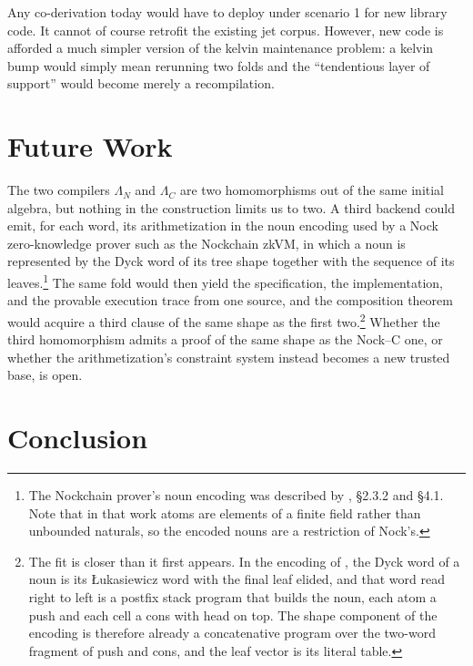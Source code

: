 \documentclass[twoside]{article}
\begin{document}
\noindent
Any co-derivation today would have to deploy under scenario 1 for new library code.  It cannot of course retrofit the existing jet corpus.  However, new code is afforded a much simpler version of the kelvin maintenance problem:  a kelvin bump would simply mean rerunning two folds and the ``tendentious layer of support'' would become merely a recompilation.

\section{Future Work}

The two compilers $\Lambda_N$ and $\Lambda_C$ are two homomorphisms out of the same initial algebra, but nothing in the construction limits us to two.  A third backend could emit, for each word, its arithmetization in the noun encoding used by a Nock zero-knowledge prover such as the Nockchain zkVM, in which a noun is represented by the Dyck word of its tree shape together with the sequence of its leaves.\footnote{The Nockchain prover's noun encoding was described by \citet{Kattis2025}, \S2.3.2 and \S4.1.  Note that in that work atoms are elements of a finite field rather than unbounded naturals, so the encoded nouns are a restriction of Nock's.}  The same fold would then yield the specification, the implementation, and the provable execution trace from one source, and the composition theorem would acquire a third clause of the same shape as the first two.\footnote{The fit is closer than it first appears.  In the encoding of \citeauthor{Kattis2025}, the Dyck word of a noun is its \L{}ukasiewicz word with the final leaf elided, and that word read right to left is a postfix stack program that builds the noun, each atom a push and each cell a cons with head on top.  The shape component of the encoding is therefore already a concatenative program over the two-word fragment of push and cons, and the leaf vector is its literal table.}  Whether the third homomorphism admits a proof of the same shape as the Nock--C one, or whether the arithmetization's constraint system instead becomes a new trusted base, is open.

\section{Conclusion}
\end{document}
